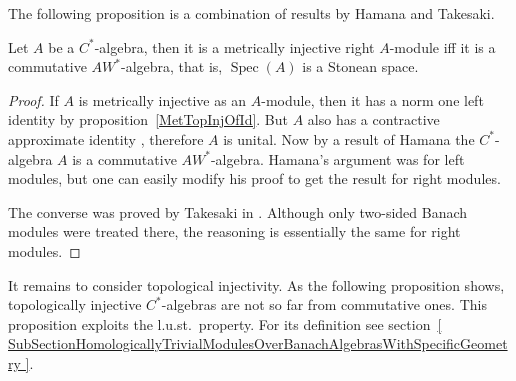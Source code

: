 The following proposition is a combination of results by Hamana and Takesaki.

\begin{proposition}\label{MetInjCStarAlgCharac} Let $A$ be a
$C^*$-algebra, then it is a metrically injective right $A$-module iff it is a
commutative $AW^*$-algebra, that is, $\operatorname{Spec}(A)$ is a Stonean space.
\end{proposition}
\begin{proof} 

If $A$ is metrically injective as an $A$-module, then it has a norm one left identity
by proposition~\ref{MetTopInjOfId}. But $A$ also has a contractive approximate
identity  \cite[theorem 4.7.79]{HelBanLocConvAlg}, therefore $A$ is unital.
Now by a result of Hamana  \cite[proposition 2]{HamInjEnvBanMod} the
$C^*$-algebra $A$ is a commutative $AW^*$-algebra. Hamana's argument was for
left modules, but one can easily modify his proof to get the result for right
modules.

The converse was proved by Takesaki in \cite[theorem 2]{TakHanBanThAndJordDecomOfModMap}. Although only two-sided Banach modules were treated there, the
reasoning is essentially the same for right modules.
\end{proof}

It remains to consider topological injectivity. As the following proposition
shows, topologically injective $C^*$-algebras are not so far from commutative
ones. This proposition exploits the l.u.st.\ property. For its definition see
section~\ref{
    SubSectionHomologicallyTrivialModulesOverBanachAlgebrasWithSpecificGeometry
}.


